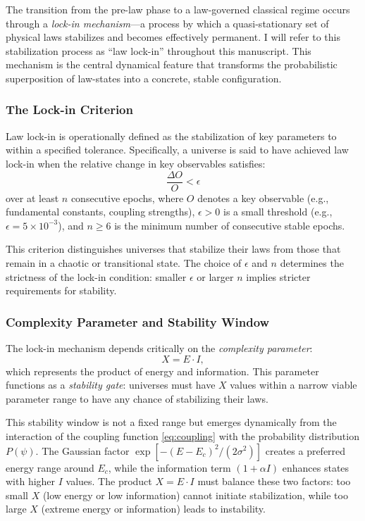 \documentclass[12pt,a4paper]{article}
\theoremstyle{definition}
\theoremstyle{remark}
\begin{document}
The transition from the pre-law phase to a law-governed classical regime occurs through a \emph{lock-in mechanism}—a process by which a quasi-stationary set of physical laws stabilizes and becomes effectively permanent. I will refer to this stabilization process as ``law lock-in'' throughout this manuscript. This mechanism is the central dynamical feature that transforms the probabilistic superposition of law-states into a concrete, stable configuration.

\subsubsection{The Lock-in Criterion}

Law lock-in is operationally defined as the stabilization of key parameters to within a specified tolerance. Specifically, a universe is said to have achieved law lock-in when the relative change in key observables satisfies:
\begin{equation}\label{eq:lockin_criterion}
\frac{\Delta O}{O} < \epsilon
\end{equation}
over at least $n$ consecutive epochs, where $O$ denotes a key observable (e.g., fundamental constants, coupling strengths), $\epsilon > 0$ is a small threshold (e.g., $\epsilon = 5 \times 10^{-3}$), and $n \geq 6$ is the minimum number of consecutive stable epochs.

This criterion distinguishes universes that stabilize their laws from those that remain in a chaotic or transitional state. The choice of $\epsilon$ and $n$ determines the strictness of the lock-in condition: smaller $\epsilon$ or larger $n$ implies stricter requirements for stability.

\subsubsection{Complexity Parameter and Stability Window}

The lock-in mechanism depends critically on the \emph{complexity parameter}:
\begin{equation}\label{eq:complexity}
X = E \cdot I,
\end{equation}
which represents the product of energy and information. This parameter functions as a \emph{stability gate}: universes must have $X$ values within a narrow viable parameter range to have any chance of stabilizing their laws.

This stability window is not a fixed range but emerges dynamically from the interaction of the coupling function \eqref{eq:coupling} with the probability distribution $P(\psi)$. The Gaussian factor $\exp[-(E - E_c)^2/(2\sigma^2)]$ creates a preferred energy range around $E_c$, while the information term $(1 + \alpha I)$ enhances states with higher $I$ values. The product $X = E \cdot I$ must balance these two factors: too small $X$ (low energy or low information) cannot initiate stabilization, while too large $X$ (extreme energy or information) leads to instability.
\end{document}
